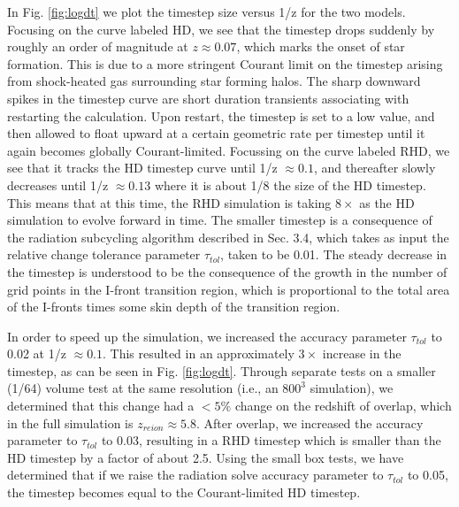 In Fig. \ref{fig:logdt} we plot the timestep size versus 1/z for the two models. Focusing on the curve labeled HD, we see that the timestep drops suddenly by roughly an order of magnitude at $z \approx 0.07$, which marks the onset of star formation. This is due to a more stringent
Courant limit on the timestep arising from shock-heated gas surrounding star forming halos. The sharp downward spikes in the timestep curve 
are short duration transients associating with restarting the calculation. Upon restart, the timestep is set to a low value, and then allowed 
to float upward at a certain geometric rate per timestep until it again becomes globally Courant-limited. Focussing on the curve labeled RHD, we see that it tracks the HD timestep curve until 1/z $\approx 0.1$, and thereafter slowly decreases until 1/z $\approx 0.13$ where it is about
1/8 the size of the HD timestep. This means that at this time, the RHD simulation is taking $8\times$ as the HD simulation to evolve forward in time. The smaller timestep is a consequence of the radiation subcycling algorithm described in Sec. 3.4, which takes as input the relative change tolerance parameter $\tau_{tol}$, taken to be 0.01. The steady decrease in the timestep is understood to be the consequence of the growth in the number of grid points in the I-front transition region, which is proportional to the total area of the I-fronts times some skin depth of the transition region. 

In order to speed up the simulation, we increased the accuracy parameter $\tau_{tol}$ to 0.02 at 1/z  $\approx 0.1$. This resulted in an approximately $3\times$ increase in the timestep, as can be seen in Fig. \ref{fig:logdt}. Through separate tests on a smaller (1/64) volume test at the same resolution (i.e., an $800^3$ simulation), we determined that this change had a $< 5\%$ change on the redshift of overlap, which in the full simulation is $z_{reion} \approx 5.8$. After overlap, we increased the accuracy parameter to $\tau_{tol}$ to 0.03, resulting in a RHD timestep which is smaller than the HD timestep by a factor of about 2.5. Using the small box tests, we have determined that if we raise the radiation solve accuracy parameter to $\tau_{tol}$ to 0.05, the timestep becomes equal to the Courant-limited HD timestep. 

